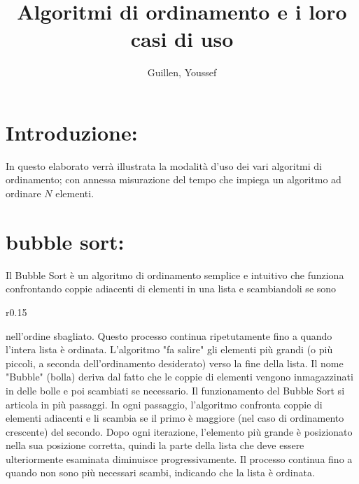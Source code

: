 \documentclass{article}
\author{Guillen, Youssef}
\title{Algoritmi di ordinamento e i loro casi di uso}
\begin{document}
\maketitle
\section*{Introduzione:}
In questo elaborato verrà illustrata la modalità d’uso dei vari algoritmi di ordinamento; con annessa misurazione del tempo che impiega un 
algoritmo ad ordinare \(N\) elementi.
\section{bubble sort:}
Il Bubble Sort è un algoritmo di ordinamento semplice e intuitivo che funziona confrontando coppie adiacenti di elementi in una lista e scambiandoli se sono 
\begin{wrapfigure}{r}{0.15\textwidth}
    \centering
\end{wrapfigure}
nell'ordine sbagliato. Questo processo continua ripetutamente fino a quando l'intera lista è ordinata. L'algoritmo "fa salire" gli elementi 
più grandi (o più piccoli, a seconda dell'ordinamento desiderato) verso la fine della lista.
Il nome "Bubble" (bolla) deriva dal fatto che le coppie di elementi vengono inmagazzinati in delle bolle e poi scambiati se necessario.
Il funzionamento del Bubble Sort si articola in più passaggi. In ogni passaggio, l'algoritmo confronta coppie di elementi adiacenti e li scambia se il primo è 
maggiore (nel caso di ordinamento crescente) del secondo. Dopo ogni iterazione, l'elemento più grande è posizionato nella sua posizione corretta, quindi la parte 
della lista che deve essere ulteriormente esaminata diminuisce progressivamente. Il processo continua fino a quando non sono più necessari scambi, 
indicando che la lista è ordinata.
\end{document}
